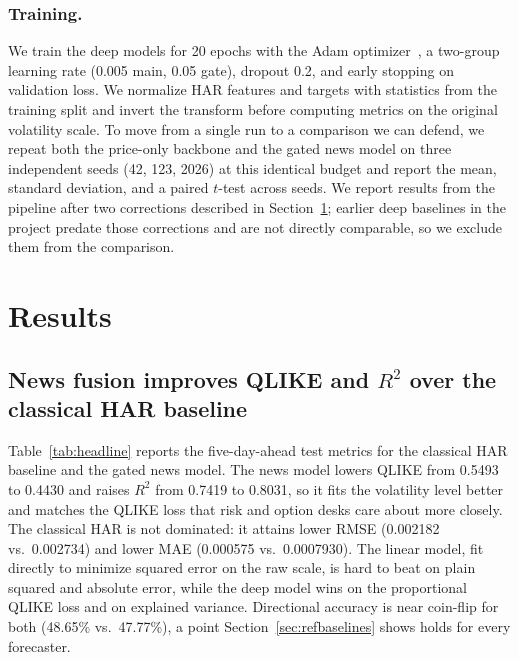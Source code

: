 \documentclass[runningheads]{llncs}
\newcommand{\qlikeHARc}{0.5493}
\newcommand{\rmseHARc}{0.002182}
\newcommand{\maeHARc}{0.000575}
\newcommand{\rsqHARc}{0.7419}
\newcommand{\diraccHARc}{48.65}
\newcommand{\qlikeNews}{0.4430}
\newcommand{\rmseNews}{0.002734}
\newcommand{\maeNews}{0.0007930}
\newcommand{\rsqNews}{0.8031}
\newcommand{\diraccNews}{47.77}
\begin{document}
\subsubsection{Training.}
We train the deep models for 20 epochs with the Adam optimizer~\cite{kingma2015}, a two-group
learning rate (0.005 main, 0.05 gate), dropout 0.2, and early stopping on validation loss. We
normalize HAR features and targets with statistics from the training split and invert the transform
before computing metrics on the original volatility scale. To move from a single run to a comparison
we can defend, we repeat both the price-only backbone and the gated news model on three independent
seeds (42, 123, 2026) at this identical budget and report the mean, standard deviation, and a paired
$t$-test across seeds. We report results from the pipeline after two corrections described in
Section~\ref{sec:results}; earlier deep baselines in the project predate those corrections and are
not directly comparable, so we exclude them from the comparison.

\section{Results}
\label{sec:results}

\subsection{News fusion improves QLIKE and \texorpdfstring{$R^2$}{R2} over the classical HAR baseline}
Table~\ref{tab:headline} reports the five-day-ahead test metrics for the classical HAR baseline and
the gated news model. The news model lowers QLIKE from \qlikeHARc{} to \qlikeNews{} and raises $R^2$
from \rsqHARc{} to \rsqNews{}, so it fits the volatility level better and matches the QLIKE loss
that risk and option desks care about more closely. The classical HAR is not dominated: it attains
lower RMSE (\rmseHARc{} vs.\ \rmseNews{}) and lower MAE (\maeHARc{} vs.\ \maeNews{}). The linear
model, fit directly to minimize squared error on the raw scale, is hard to beat on plain squared and
absolute error, while the deep model wins on the proportional QLIKE loss and on explained variance.
Directional accuracy is near coin-flip for both (\diraccHARc\% vs.\ \diraccNews\%), a point
Section~\ref{sec:refbaselines} shows holds for every forecaster.
\end{document}
